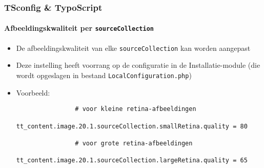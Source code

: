 \begin{frame}[fragile]
	\frametitle{TSconfig \& TypoScript}
	\framesubtitle{Afbeeldingskwaliteit per \texttt{sourceCollection}}

	\lstset{basicstyle=\tiny\ttfamily}

	\begin{itemize}

		\item De afbeeldingskwaliteit van elke \texttt{sourceCollection} kan worden aangepast

		\item Deze instelling heeft voorrang op de configuratie in de Installatie-module
			(die wordt opgeslagen in bestand \texttt{LocalConfiguration.php})

		\item Voorbeeld:

			\begin{lstlisting}
				# voor kleine retina-afbeeldingen
				tt_content.image.20.1.sourceCollection.smallRetina.quality = 80

				# voor grote retina-afbeeldingen
				tt_content.image.20.1.sourceCollection.largeRetina.quality = 65
			\end{lstlisting}

	\end{itemize}

\end{frame}



